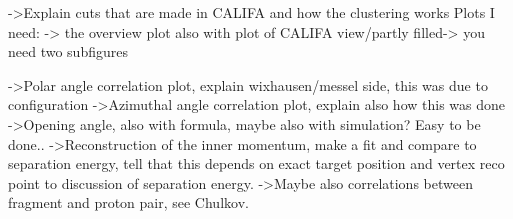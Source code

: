 ->Explain cuts that are made in CALIFA and how the clustering works
Plots I need:
-> the overview plot also with plot of CALIFA view/partly filled-> you need two subfigures

->Polar angle correlation plot, explain wixhausen/messel side, this was due to configuration
->Azimuthal angle correlation plot, explain also how this was done
->Opening angle, also with formula, maybe also with simulation? Easy to be done..
->Reconstruction of the inner momentum, make a fit and compare to separation energy, tell that this depends on exact target position and vertex reco point to discussion of separation energy.
->Maybe also correlations between fragment and proton pair, see Chulkov.


